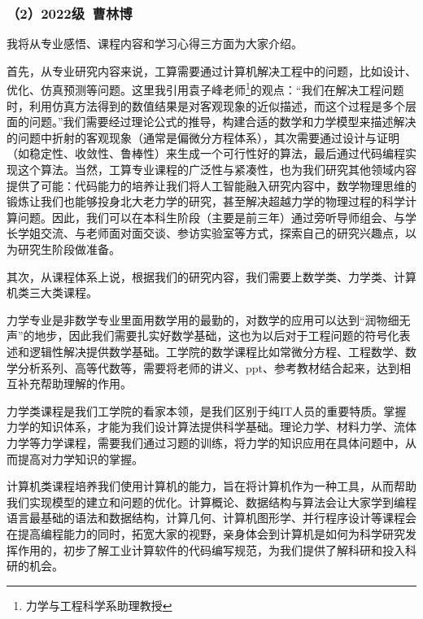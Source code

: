 \documentclass[11pt,oneside]{book}
\begin{document}
\subsubsection{（2）2022级\ 曹林博}

我将从专业感悟、课程内容和学习心得三方面为大家介绍。

\vspace{10pt}

首先，从专业研究内容来说，工算需要通过计算机解决工程中的问题，比如设计、优化、仿真预测等问题。这里我引用袁子峰老师\footnote{力学与工程科学系助理教授}的观点：“我们在解决工程问题时，利用仿真方法得到的数值结果是对客观现象的近似描述，而这个过程是多个层面的问题。”我们需要经过理论公式的推导，构建合适的数学和力学模型来描述解决的问题中折射的客观现象（通常是偏微分方程体系），其次需要通过设计与证明（如稳定性、收敛性、鲁棒性）来生成一个可行性好的算法，最后通过代码编程实现这个算法。当然，工算专业课程的广泛性与紧凑性，也为我们研究其他领域内容提供了可能：代码能力的培养让我们将人工智能融入研究内容中，数学物理思维的锻炼让我们也能够投身北大老力学的研究，甚至解决超越力学的物理过程的科学计算问题。因此，我们可以在本科生阶段（主要是前三年）通过旁听导师组会、与学长学姐交流、与老师面对面交谈、参访实验室等方式，探索自己的研究兴趣点，以为研究生阶段做准备。

\vspace{10pt}

其次，从课程体系上说，根据我们的研究内容，我们需要上数学类、力学类、计算机类三大类课程。

\vspace{10pt}

力学专业是非数学专业里面用数学用的最勤的，对数学的应用可以达到“润物细无声”的地步，因此我们需要扎实好数学基础，这也为以后对于工程问题的符号化表述和逻辑性解决提供数学基础。工学院的数学课程比如常微分方程、工程数学、数学分析系列、高等代数等，需要将老师的讲义、ppt、参考教材结合起来，达到相互补充帮助理解的作用。

\vspace{10pt}

力学类课程是我们工学院的看家本领，是我们区别于纯IT人员的重要特质。掌握力学的知识体系，才能为我们设计算法提供科学基础。理论力学、材料力学、流体力学等力学课程，需要我们通过习题的训练，将力学的知识应用在具体问题中，从而提高对力学知识的掌握。

\vspace{10pt}

计算机类课程培养我们使用计算机的能力，旨在将计算机作为一种工具，从而帮助我们实现模型的建立和问题的优化。计算概论、数据结构与算法会让大家学到编程语言最基础的语法和数据结构，计算几何、计算机图形学、并行程序设计等课程会在提高编程能力的同时，拓宽大家的视野，亲身体会到计算机是如何为科学研究发挥作用的，初步了解工业计算软件的代码编写规范，为我们提供了解科研和投入科研的机会。
\end{document}
